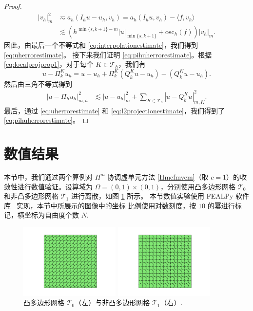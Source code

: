 \begin{proof}
\begin{align*}
|v_h|_m^2 & \eqsim a_h(I_hu-u_h, v_h)=a_h(I_hu, v_h)-\langle f, v_h\rangle \\
&\lesssim (h^{\min\{s,k+1\}-m}|u|_{\min\{s,k+1\}}+\textrm{osc}_h(f))|v_h|_{m}.
\end{align*}
因此，由最后一个不等式和 \eqref{eq:interpolationestimate}，我们得到 \eqref{eq:uherrorestimate}。
接下来我们证明 \eqref{eq:pihuherrorestimate}。根据 \eqref{eq:localprojprop1}，对于每个 $K\in\mathcal T_h$，我们有
$$
u-\Pi_k^Ku_h=u-u_h+\Pi_k^K(Q_k^Ku-u_h)-(Q_k^Ku-u_h).
$$
然后由三角不等式得到
\begin{align*}
|u-\Pi_hu_h|_{m,h}^2&
\lesssim |u-u_h|_{m}^2+\sum_{K\in\mathcal T_h}|u-Q_k^Ku|_{m,K}^2.
\end{align*}
最后，通过 \eqref{eq:uherrorestimate} 和 \eqref{eq:l2projectionestimate}，我们得到了 \eqref{eq:pihuherrorestimate}。
\end{proof}

\section{数值结果}\label{sec:numericalexamps}

本节中，我们通过两个算例对 $H^m$ 协调虚单元方法 \eqref{Hmcfmvem}（取
$c=1$）的收敛性进行数值验证。设算域为 $\Omega = (0, 1)\times(0,
1)$，分别使用凸多边形网格 $\mathcal{T}_0$ 和非凸多边形网格
$\mathcal{T}_1$ 进行离散，如图 \ref{fig:mesh} 所示。
本节数值实验使用 FEALPy 软件库~\cite{fealpy} 实现，本节中所展示的图像中的坐标
比例使用对数刻度，按 $10$ 的幂进行标记，横坐标为自由度个数 $N$.

\begin{figure}[htbp]
\centering
\begin{minipage}[t]{0.49\linewidth}
\centering
\includegraphics[width=5cm]{./figures/hmvem/convex.pdf}
\end{minipage}%
\begin{minipage}[t]{0.49\linewidth}
\centering
\includegraphics[width=5cm]{./figures/hmvem/nonconvex.pdf}
\end{minipage}%
\centering
\caption{凸多边形网格 $\mathcal{T}_0$（左）与非凸多边形网格
$\mathcal{T}_1$（右）.}
\label{fig:mesh}
\end{figure}

